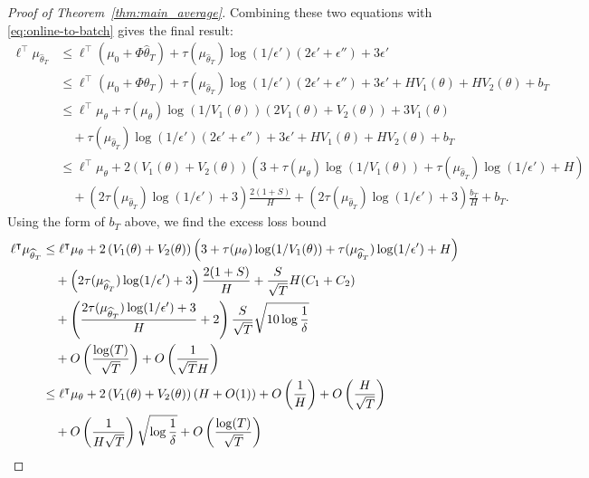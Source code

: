 \documentclass[11pt]{article}
\begin{document}
\begin{proof}[Proof of Theorem~\ref{thm:main_average}]
Combining these two equations with \eqref{eq:online-to-batch} gives the final result:
\begin{align*}
  \ell^\top\mu_{\widehat\theta_T}
  &\le
    \ell^\top(\mu_0 + \Phi\widehat\theta_T) + \tau(\mu_{\widehat\theta_T}) \log(1/\epsilon') (2\epsilon'+\epsilon'') + 3\epsilon'\\
  &\leq
    \ell^\top(\mu_0 + \Phi\theta_T) + \tau(\mu_{\widehat\theta_T}) \log(1/\epsilon') (2\epsilon'+\epsilon'')
    + 3\epsilon' + H V_1(\theta) + H V_2(\theta) + b_T\\
  &\leq
    \ell^\top\mu_\theta +
\tau(\mu_{\theta}) \log(1/V_1(\theta)) (2V_1(\theta) + V_2(\theta)) + 3V_1(\theta)\\
  & \quad + \tau(\mu_{\widehat\theta_T}) \log(1/\epsilon') (2\epsilon'+\epsilon'')
    + 3\epsilon' + H V_1(\theta) + H V_2(\theta) + b_T\\
&\leq
    \ell^\top\mu_\theta +
2\left(V_1(\theta) + V_2(\theta)\right)
\left(3 + \tau(\mu_{\theta}) \log(1/V_1(\theta))
+ \tau(\mu_{\widehat\theta_T}) \log(1/\epsilon')
+H
\right)\\
  & \quad + \left(2\tau(\mu_{\widehat\theta_T}) \log(1/\epsilon')+3\right)\frac{2(1+S)}{H}
+ (2\tau(\mu_{\widehat\theta_T}) \log(1/\epsilon')+3)\frac{b_T}{H}+b_T.
\end{align*}
Using the form of $b_T$ above, we find the excess loss bound
\begin{align}
  \ell^\top\mu_{\widehat\theta_T}
  &\leq
    \ell^\top\mu_\theta +
 2\left(V_1(\theta) + V_2(\theta)\right)
 \left(3 + \tau(\mu_{\theta}) \log(1/V_1(\theta))
+ \tau(\mu_{\widehat\theta_T}) \log(1/\epsilon')
+H \right)\notag\\
 &\quad  + \left(2\tau(\mu_{\widehat\theta_T}) \log(1/\epsilon')+3\right)\frac{2(1+S)}{H}
+ \frac{S}{\sqrt{T}} H (C_1 + C_2)\notag\\
&\quad+ \left(\frac{2\tau(\mu_{\widehat\theta_T}) \log(1/\epsilon')+3}{H}+2\right)
 \frac{S}{\sqrt{T}}
   \sqrt{10 \log\frac{1}{\delta}}\notag\\
   &\quad
  +O\left(\frac{\log(T)}{\sqrt{T}}\right)+ O\left(\frac{1}{\sqrt{T}H}\right)\label{eqn:average.regret.constants}\\
  &\leq
    \ell^\top\mu_\theta +
 2\left(V_1(\theta) + V_2(\theta)\right)\left(H+ O(1)\right)
+O\left(\frac{1}{H}\right)+O\left(\frac{H}{\sqrt{T}}\right)\notag\\
&\quad+
O\left( \frac{1}{H\sqrt{T}}\right)   \sqrt{ \log\frac{1}{\delta}}
  +O\left(\frac{\log(T)}{\sqrt{T}}\right)
\end{align}

\end{proof}
\end{document}
